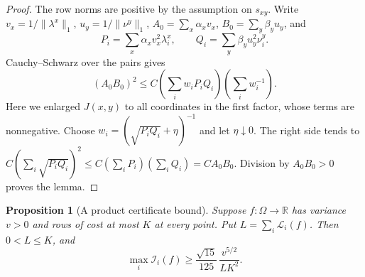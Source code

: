 \documentclass[11pt,reqno]{amsart}
\newtheorem{proposition}[theorem]{Proposition}
\theoremstyle{definition}
\theoremstyle{remark}
\newcommand{\R}{\mathbb R}
\newcommand{\cI}{\mathcal I}
\newcommand{\cL}{\mathcal L}
\newcommand{\norm}[1]{\lVert #1\rVert_1}
\numberwithin{equation}{section}
\begin{document}
\begin{proof}
The row norms are positive by the assumption on $s_{xy}$.
Write $v_x=1/\norm{\lambda^x}$, $u_y=1/\norm{\nu^y}$,
$A_0=\sum_x\alpha_xv_x$, $B_0=\sum_y\beta_yu_y$, and
\[
 P_i=\sum_x\alpha_xv_x^2\lambda_i^x,\qquad
 Q_i=\sum_y\beta_yu_y^2\nu_i^y.
\]
Cauchy--Schwarz over the pairs gives
\[
 (A_0B_0)^2\le C\left(\sum_iw_iP_iQ_i\right)
                         \left(\sum_iw_i^{-1}\right).
\]
Here we enlarged $J(x,y)$ to all coordinates in the first factor, whose
terms are nonnegative. Choose $w_i=(\sqrt{P_iQ_i}+\eta)^{-1}$ and let
$\eta\downarrow0$. The right side tends to
$C(\sum_i\sqrt{P_iQ_i})^2\le C(\sum_iP_i)(\sum_iQ_i)=CA_0B_0$.
Division by $A_0B_0>0$ proves the lemma.
\end{proof}

\begin{proposition}[A product certificate bound]\label{prop:certificate}
Suppose $f\colon\Omega\to\R$ has variance $v>0$ and rows of cost at most
$K$ at every point. Put $L=\sum_i\cL_i(f)$. Then $0<L\le K$, and
\begin{equation}\label{eq:certificate}
 \max_i\cI_i(f)\ge\frac{\sqrt{15}}{125}\,
                         \frac{v^{5/2}}{LK^2}.
\end{equation}
\end{proposition}
\end{document}
